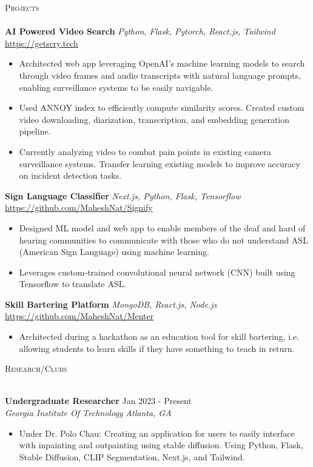 \documentclass[a4paper]{article}
\newcommand{\lineunder} {
    \vspace*{-8pt} \\
    \hspace*{-18pt} \hrulefill \\
}
\newcommand{\header} [1] {
    {\hspace*{-18pt}\vspace*{6pt} \textsc{#1}}
    \vspace*{-6pt} \lineunder
}
\begin{document}
\header{Projects}
\vspace*{1mm}
{\textbf{AI Powered Video Search}} {\sl Python, Flask, Pytorch, React.js, Tailwind} \hfill \url{https://getscry.tech} \\
\begin{itemize} \itemsep -1pt
	\item Architected web app leveraging OpenAI's machine learning models to search through video frames and audio transcripts with natural language prompts, enabling surveillance systems to be easily navigable.
        \item Used ANNOY index to efficiently compute similarity scores. Created custom video downloading, diarization, transcription, and embedding generation pipeline.
        \item Currently analyzing video to combat pain points in existing camera surveillance systems. Transfer learning existing models to improve accuracy on incident detection tasks.
\end{itemize}
{\textbf{Sign Language Classifier}} {\sl Next.js, Python, Flask, Tensorflow} \hfill \url{https://github.com/MaheshNat/Signify}\\
\begin{itemize} \itemsep -1pt
	\item Designed ML model and web app to enable members of the deaf and hard of hearing communities to communicate with those who do not understand ASL (American Sign Language) using machine learning.
	\item Leverages custom-trained convolutional neural network (CNN) built using Tensorflow to translate ASL.
\end{itemize}
\vspace*{1mm}
{\textbf{Skill Bartering Platform}} {\sl MongoDB, React.js, Node.js} \hfill \url{https://github.com/MaheshNat/Menter}\\
\begin{itemize} \itemsep -1pt
	\item Architected during a hackathon as an education tool for skill bartering, i.e. allowing students to learn skills if they have something to teach in return.
\end{itemize}
\vspace*{1mm}

\header{Research/Clubs}
\vspace{1mm}

\textbf{Undergraduate Researcher} \hfill Jan 2023 - Present\\
\textit{Georgia Institute Of Technology} \hfill \textit{Atlanta, GA} \\
\vspace{-1mm}
\begin{itemize} \itemsep -1pt
	\item Under Dr. Polo Chau: Creating an application for users to easily interface with inpainting and outpainting using stable diffusion. Using Python, Flask, Stable Diffusion, CLIP Segmentation, Next.js, and Tailwind.
\end{itemize}
\end{document}
